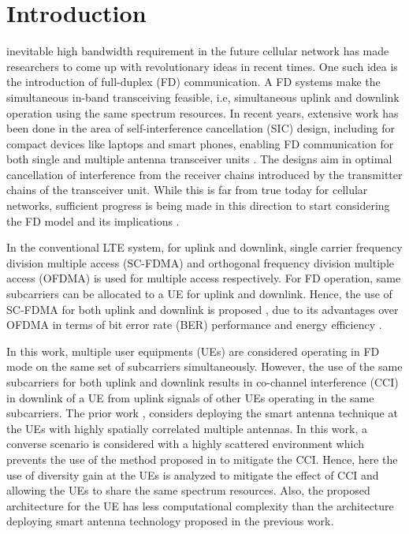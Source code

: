 \documentclass[conference]{IEEEtran}
\begin{document}
%
\IEEEpeerreviewmaketitle


\section{Introduction}

 inevitable high bandwidth requirement in the future cellular network has made researchers to come up with revolutionary ideas in recent times. One such idea is the introduction of full-duplex (FD) communication. A FD systems make the simultaneous in-band transceiving feasible, i.e, simultaneous uplink and downlink operation using the same spectrum resources. In recent years, extensive work has been done in the area of self-interference cancellation (SIC) design, including for compact devices like laptops and smart phones, enabling FD communication for both single and multiple antenna transceiver units \cite{full_duplex, compact}. The designs aim in optimal cancellation of interference from the receiver chains introduced by the transmitter chains of the transceiver unit. While this is far from true today for cellular networks, sufficient progress is being made in this direction to start considering the FD model and its implications \cite{fd_small}. \par

     In the conventional LTE system, for uplink and downlink, single carrier frequency division multiple access (SC-FDMA) and orthogonal frequency division multiple access (OFDMA) is used for multiple access respectively. For FD operation, same subcarriers can be allocated to a UE for uplink and downlink. Hence, the use of SC-FDMA for both uplink and downlink is proposed \cite{ants}, due to its advantages over OFDMA in terms of bit error rate (BER) performance and energy efficiency \cite{sc_fdma}. \par
     
    In this work, multiple user equipments (UEs) are considered operating in FD mode on the same set of subcarriers simultaneously. However, the use of the same subcarriers for both uplink and downlink results in co-channel interference (CCI) in downlink of a UE from uplink signals of other UEs operating in the same subcarriers. The prior work \cite{ants}, considers deploying the smart antenna technique at the UEs with highly spatially correlated multiple antennas.  In this work, a converse scenario is considered with a highly scattered environment which prevents the use of the method proposed in \cite{ants} to mitigate the CCI. Hence, here the use of diversity gain at the UEs is analyzed to mitigate the effect of CCI and allowing the UEs to share the same spectrum resources. Also, the proposed architecture for the UE has less computational complexity than the architecture deploying smart antenna technology proposed in the previous work. \par
    
\end{document}
